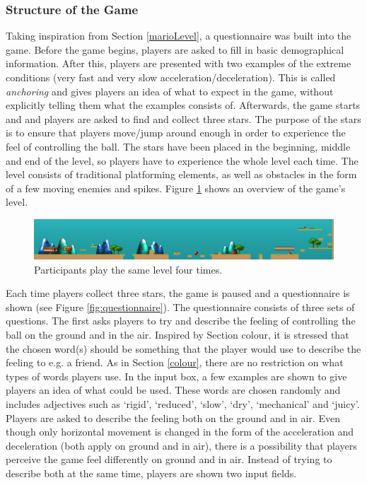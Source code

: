 \subsubsection{Structure of the Game}
Taking inspiration from Section \ref{marioLevel}, a questionnaire was built into the game. Before the game begins, players are asked to fill in basic demographical information. After this, players are presented with two examples of the extreme conditions (very fast and very slow acceleration/deceleration). This is called \textit{anchoring} \cite{cunningham} and gives players an idea of what to expect in the game, without explicitly telling them what the examples consists of. Afterwards, the game starts and and players are asked to find and collect three stars. The purpose of the stars is to ensure that players move/jump around enough in order to experience the feel of controlling the ball. The stars have been placed in the beginning, middle and end of the level, so players have to experience the whole level each time. The level consists of traditional platforming elements, as well as obstacles in the form of a few moving enemies and spikes. Figure \ref{fig:level} shows an overview of the game's level.

\begin{figure}[htbp]
\centering
\includegraphics[width=1\textwidth]{Pics/levelStructure}
\caption{Participants play the same level four times.}
\label{fig:level}
\end{figure}

Each time players collect three stars, the game is paused and a questionnaire is shown (see Figure \ref{fig:questionnaire}). The questionnaire consists of three sets of questions. The first asks players to try and describe the feeling of controlling the ball on the ground and in the air. Inspired by Section {colour}, it is stressed that the chosen word(s) should be something that the player would use to describe the feeling to e.g. a friend. As in Section \ref{colour}, there are no restriction on what types of words players use. In the input box, a few examples are shown to give players an idea of what could be used. These words are chosen randomly and includes adjectives such as `rigid', `reduced', `slow', `dry', `mechanical' and `juicy'. Players are asked to describe the feeling both on the ground and in air. Even though only horizontal movement is changed in the form of the acceleration and deceleration (both apply on ground and in air), there is a possibility that players perceive the game feel differently on ground and in air. Instead of trying to describe both at the same time, players are shown two input fields.

